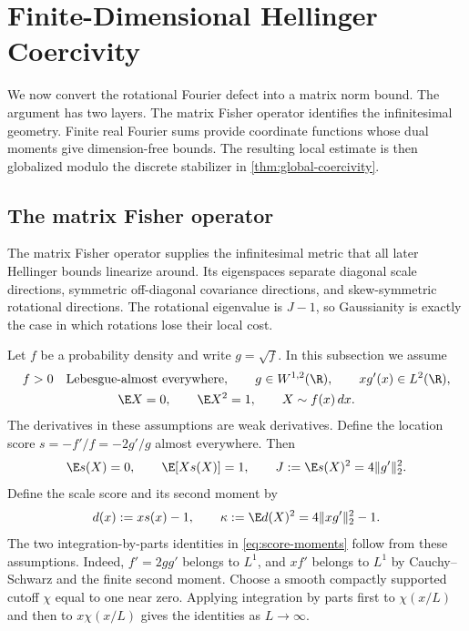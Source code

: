 \section{Finite-Dimensional Hellinger Coercivity}
\label{sec:finite-dimensional-hellinger-coercivity}

We now convert the rotational Fourier defect into a matrix norm bound.
The argument has two layers.
The matrix Fisher operator identifies the infinitesimal geometry.
Finite real Fourier sums provide coordinate functions whose dual moments
give dimension-free bounds.
The resulting local estimate is then globalized modulo the discrete
stabilizer in
\cref{thm:global-coercivity}.

\subsection{The matrix Fisher operator}
\label{sec:fisher-operator}

The matrix Fisher operator supplies the infinitesimal metric that all later
Hellinger bounds linearize around.
Its eigenspaces separate diagonal scale directions, symmetric off-diagonal
covariance directions, and skew-symmetric rotational directions.
The rotational eigenvalue is \(J-1\), so Gaussianity is exactly the case in
which rotations lose their local cost.

Let $f$ be a probability density and write $g=\sqrt f$.
In this subsection we assume
\begin{equation}
 \begin{gathered}
 f>0\quad\text{Lebesgue-almost everywhere},\qquad
 g\in W^{1,2}(\R),\qquad xg'(x)\in L^2(\R),\\
 \E X=0,\qquad \E X^2=1,
 \qquad X\sim f(x)\,dx.
 \end{gathered}
 \label{eq:fisher-regularity}
\end{equation}
The derivatives in these assumptions are weak derivatives.
Define the location score $s=-f'/f=-2g'/g$ almost everywhere.  Then
\begin{equation}
 \E s(X)=0,\qquad \E[Xs(X)]=1,\qquad
 J:=\E s(X)^2=4\|g'\|_2^2.
 \label{eq:score-moments}
\end{equation}
Define the scale score and its second moment by
\begin{equation}
 d(x):=xs(x)-1,\qquad
 \kappa:=\E d(X)^2=4\|xg'\|_2^2-1.
 \label{eq:kappa}
\end{equation}
The two integration-by-parts identities in
\eqref{eq:score-moments} follow from these assumptions.
Indeed,
$f'=2gg'$ belongs to $L^1$, and $xf'$ belongs to $L^1$ by
Cauchy--Schwarz and the finite second moment.  Choose a smooth compactly
supported cutoff $\chi$ equal to one near zero.  Applying integration by
parts first to $\chi(x/L)$ and then to
$x\chi(x/L)$ gives the identities as $L\to\infty$.

